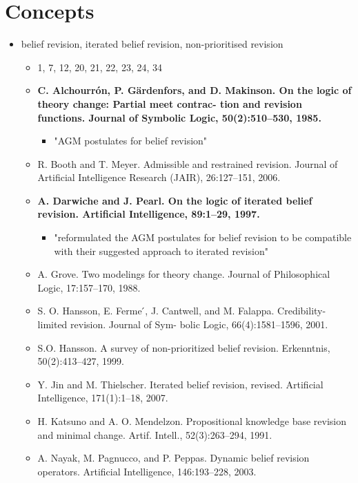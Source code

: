 \documentclass[11pt]{article}
\begin{document}
\section{Concepts}
\begin{itemize}
    \item belief revision, iterated belief revision, non-prioritised revision
    \begin{itemize}
        \item 1, 7, 12, 20, 21, 22, 23, 24, 34
        \item \textbf{C. Alchourrón, P. Gärdenfors, and D. Makinson. On the logic of theory change: Partial meet contrac- tion and revision functions. Journal of Symbolic Logic, 50(2):510–530, 1985.}
        \begin{itemize}
            \item "AGM postulates for belief revision"
        \end{itemize}
        \item R. Booth and T. Meyer. Admissible and restrained revision. Journal of Artificial Intelligence Research (JAIR), 26:127–151, 2006.
        \item \textbf{A. Darwiche and J. Pearl. On the logic of iterated belief revision. Artificial Intelligence, 89:1–29, 1997.}
        \begin{itemize}
            \item "reformulated the AGM postulates for belief revision to be compatible with their suggested approach to iterated revision"
        \end{itemize}
        \item A. Grove. Two modelings for theory change. Journal of Philosophical Logic, 17:157–170, 1988.
        \item S. O. Hansson, E. Ferme ́, J. Cantwell, and M. Falappa. Credibility-limited revision. Journal of Sym- bolic Logic, 66(4):1581–1596, 2001.
        \item S.O. Hansson. A survey of non-prioritized belief revision. Erkenntnis, 50(2):413–427, 1999.
        \item Y. Jin and M. Thielscher. Iterated belief revision, revised. Artificial Intelligence, 171(1):1–18, 2007.
        \item H. Katsuno and A. O. Mendelzon. Propositional knowledge base revision and minimal change. Artif. Intell., 52(3):263–294, 1991.
        \item A. Nayak, M. Pagnucco, and P. Peppas. Dynamic belief revision operators. Artificial Intelligence,
146:193–228, 2003.

\end{itemize}
\end{itemize}
\end{document}
